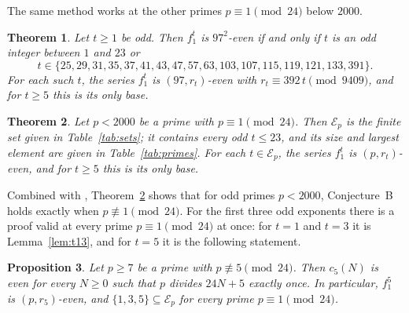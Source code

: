 \documentclass[12pt]{amsart}
\newtheorem{theorem}{Theorem}
\newtheorem{proposition}[theorem]{Proposition}
\theoremstyle{definition}
\newcommand{\cE}{\mathcal{E}}
\newcommand{\notlean}[1]{\ignorespaces}
\newcommand{\computed}[2]{\ignorespaces}
\begin{document}
The same method works at the other primes $p\equiv1\pmod{24}$ below $2000$.

\begin{theorem}\label{thm:97}
\notlean{}
\computed{sh paper/check.sh 97}{code/impl1/out/tree_p97.txt}
\computed{sh code/impl2/rerun.sh sturm_p97 sparse_p97 search_p97, the second implementation, with other parameters}{code/impl2/sturm_p97.out, code/impl2/sparse_p97.out, code/impl2/search_p97.out}
Let $t\ge1$ be odd. Then $f_1^t$ is $97^2$-even if and only if $t$ is an odd integer between $1$ and $23$ or
\[
t\in\{25,29,31,35,37,41,43,47,57,63,103,107,115,119,121,133,391\}.
\]
For each such $t$, the series $f_1^t$ is $(97,r_t)$-even with $r_t\equiv392\,t\pmod{9409}$, and for $t\ge5$ this is its only base.
\end{theorem}

\begin{theorem}\label{thm:all}
\notlean{}
\computed{sh paper/check.sh <p>, for each prime of Table~\ref{tab:primes}}{code/impl1/out/tree_p<p>.txt}
\computed{sh code/impl2/rerun.sh sturm_p193 certificate_p193 sturm_p337 certificate_p337 sturm_p1033 certificate_p1033, the second implementation (the whole certificate at $p=193$, every step but the search at $p=337$ and $p=1033$)}{code/impl2/sturm_p193.out, code/impl2/certificate_p193.out, code/impl2/sturm_p337.out, code/impl2/certificate_p337.out, code/impl2/sturm_p1033.out, code/impl2/certificate_p1033.out}
Let $p<2000$ be a prime with $p\equiv1\pmod{24}$. Then $\cE_p$ is the finite set given in Table~\ref{tab:sets}; it contains every odd $t\le23$, and its size and largest element are given in Table~\ref{tab:primes}. For each $t\in\cE_p$, the series $f_1^t$ is $(p,r_t)$-even, and for $t\ge5$ this is its only base.
\end{theorem}

Combined with \cite[Corollary~21]{KZ3}, Theorem~\ref{thm:all} shows that for odd primes $p<2000$, Conjecture~B holds exactly when $p\not\equiv1\pmod{24}$. For the first three odd exponents there is a proof valid at every prime $p\equiv1\pmod{24}$ at once: for $t=1$ and $t=3$ it is Lemma~\ref{lem:t13}, and for $t=5$ it is the following statement.

\begin{proposition}\label{prop:t5}
\notlean{the formal proof of Theorem~\ref{thm:73} obtains the case $p=73$, $t=5$ from Lemma~\ref{lem:sturm}}
\computed{gp -q paper/small_checks.gp, part 4 (the divisor-sum formula for $N<20000$)}{paper/small_checks.out}
\computed{gp -q code/gp/t5_check.gp, a numerical test for $N<200000$}{code/gp/t5_check.out}
Let $p\ge7$ be a prime with $p\not\equiv5\pmod{24}$. Then $c_5(N)$ is even for every $N\ge0$ such that $p$ divides $24N+5$ exactly once. In particular, $f_1^5$ is $(p,r_5)$-even, and $\{1,3,5\}\subseteq\cE_p$ for every prime $p\equiv1\pmod{24}$.
\end{proposition}
\end{document}
